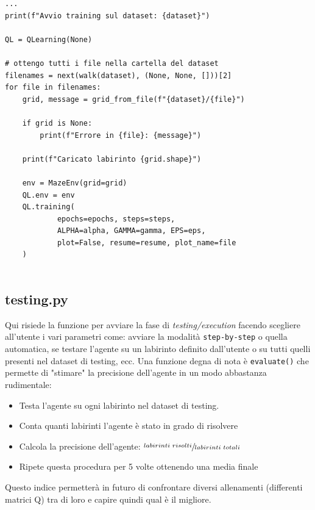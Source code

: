 \begin{lstlisting}[style=python, caption={Parte di codice della funzione che avvia la fase di allenamento utilizzando il dataset creato in precedenza}]
...
print(f"Avvio training sul dataset: {dataset}")

QL = QLearning(None)

# ottengo tutti i file nella cartella del dataset
filenames = next(walk(dataset), (None, None, []))[2]
for file in filenames:
	grid, message = grid_from_file(f"{dataset}/{file}")

	if grid is None:
		print(f"Errore in {file}: {message}")

	print(f"Caricato labirinto {grid.shape}")

	env = MazeEnv(grid=grid)
	QL.env = env
	QL.training(
			epochs=epochs, steps=steps, 
			ALPHA=alpha, GAMMA=gamma, EPS=eps, 
			plot=False, resume=resume, plot_name=file
	)
	
\end{lstlisting}
\pagebreak
\subsection{testing.py}
\label{sec:testing}

Qui risiede la funzione per avviare la fase di \textit{testing/execution} facendo scegliere all'utente i vari parametri come: avviare la modalit\`{a} \lstinline[style=cmd]|step-by-step| o quella automatica, se testare l'agente su un labirinto definito dall'utente o su tutti quelli presenti nel dataset di testing, ecc. Una funzione degna di nota \`{e} \lstinline[style=cmd]|evaluate()| che permette di "stimare" la precisione dell'agente in un modo abbastanza rudimentale:

\begin{itemize}
	\item Testa l'agente su ogni labirinto nel dataset di testing.
	\item Conta quanti labirinti l'agente \`{e} stato in grado di risolvere
	\item Calcola la precisione dell'agente: $\sfrac{labirinti \ risolti}{labirinti \ totali}$
	\item Ripete questa procedura per 5 volte ottenendo una media finale
\end{itemize}

Questo indice permetter\`{a} in futuro di confrontare diversi allenamenti (differenti matrici Q) tra di loro e capire quindi qual \`{e} il migliore.\\

